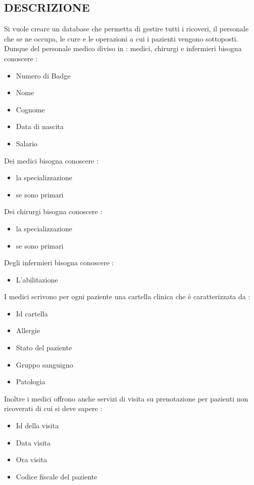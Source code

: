 \documentclass[a4paper, 10pt]{article}
\begin{document}
\subsection{DESCRIZIONE}
Si vuole creare un database che permetta di gestire tutti i ricoveri, il personale che se ne occupa, le cure e le operazioni a cui i pazienti vengono sottoposti.
Dunque del personale medico diviso in : medici, chirurgi e infermieri  bisogna conoscere :
\begin{spacing}{0.8}
\begin{itemize}
    \item Numero di Badge
    \item Nome
    \item Cognome
    \item Data di nascita
    \item Salario
\end{itemize}
Dei medici bisogna conoscere :
\begin{itemize}
    \item la specializzazione
    \item se sono primari
\end{itemize}
Dei chirurgi bisogna conoscere :
\begin{itemize}
    \item la specializzazione
    \item se sono primari
\end{itemize}
Degli infermieri bisogna conoscere :
\begin{itemize}
    \item L'abilitazione
\end{itemize}
I medici scrivono per ogni paziente una cartella clinica che è caratterizzata da :
\begin{itemize}
    \item Id cartella
    \item Allergie
    \item Stato del paziente
    \item Gruppo sanguigno
    \item Patologia
\end{itemize}
Inoltre i medici offrono anche servizi di visita su prenotazione per pazienti non ricoverati di cui si deve sapere : 
\begin{itemize}
    \item Id della visita
    \item Data visita
    \item Ora visita
    \item Codice fiscale del paziente

\end{itemize}
\end{spacing}
\end{document}

